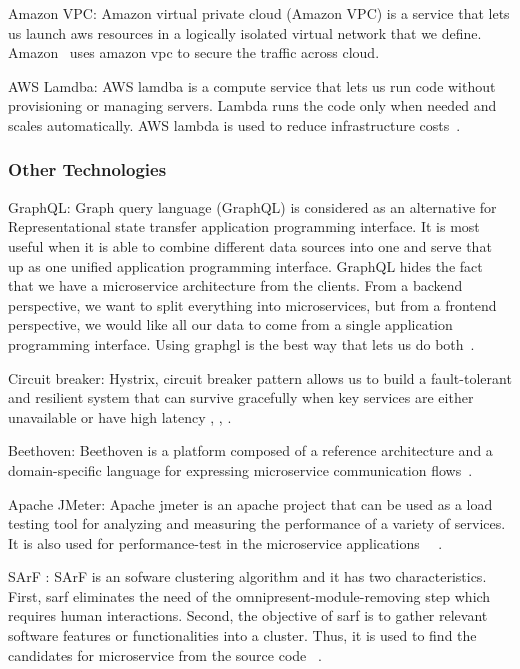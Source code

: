 \par Amazon VPC: Amazon virtual private cloud (Amazon VPC) is a service that lets us launch aws resources in a logically isolated virtual network that we define. Amazon~\cite{Amazon} uses amazon vpc to secure the traffic across cloud.

\par AWS Lamdba: AWS lamdba is a compute service that lets us run code without provisioning or managing servers. Lambda runs the code only when needed and scales automatically. AWS lambda is used to reduce infrastructure costs~\cite{villamizar2017}.

\subsubsection{Other Technologies}

\par GraphQL: Graph query language (GraphQL) is considered as an alternative for Representational state transfer application programming interface. It is most useful when it is able to combine different data sources into one and serve that up as one unified application programming interface. GraphQL hides the fact that we have a microservice architecture from the clients. From a backend perspective, we want to split everything into microservices, but from a frontend perspective, we would like all our data to come from a single application programming interface. Using graphgl is the best way that lets us do both~\cite{Ghebremicael2017, wang2020, overeem2018, gozneli2020}.

\par Circuit breaker: Hystrix, circuit breaker pattern allows us to build a fault-tolerant and resilient system that can survive gracefully when key services are either unavailable or have high latency \cite{Kalske2017}, \cite{Rodrigue2016}, \cite{Uber}. 

\par Beethoven: Beethoven is a platform composed of a reference architecture and a domain-specific language for expressing microservice communication flows~\cite{Monteiro2020}.

\par Apache JMeter: Apache jmeter is an apache project that can be used as a load testing tool for analyzing and measuring the performance of a variety of services. It is also used for performance-test in the microservice applications ~\cite{Hou2019}~\cite{Johansson2019}.

\par SArF : SArF is an sofware clustering algorithm and it has two characteristics. First, sarf eliminates the need of the omnipresent-module-removing step which requires human interactions. Second, the objective of sarf is to gather relevant software features or functionalities into a cluster. Thus, it is used to find the candidates for microservice from the source code ~\cite{Kamimura2018}.

